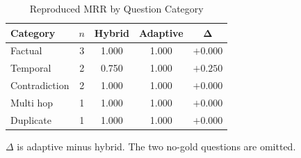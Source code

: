 \begin{table}[t]
\caption{Reproduced MRR by Question Category}
\label{tab:category}
\centering
\footnotesize
\setlength{\tabcolsep}{4pt}
\begin{tabular}{@{}lcccc@{}}
\toprule
\textbf{Category} & \textbf{$n$} & \textbf{Hybrid} & \textbf{Adaptive} & $\boldsymbol{\Delta}$ \\
\midrule
Factual & 3 & 1.000 & 1.000 & $+0.000$ \\
Temporal & 2 & 0.750 & 1.000 & $+0.250$ \\
Contradiction & 2 & 1.000 & 1.000 & $+0.000$ \\
Multi hop & 1 & 1.000 & 1.000 & $+0.000$ \\
Duplicate & 1 & 1.000 & 1.000 & $+0.000$ \\
\bottomrule
\end{tabular}
\par\vspace{2pt}
\raggedright\scriptsize $\Delta$ is adaptive minus hybrid. The two no-gold questions are omitted.
\end{table}
